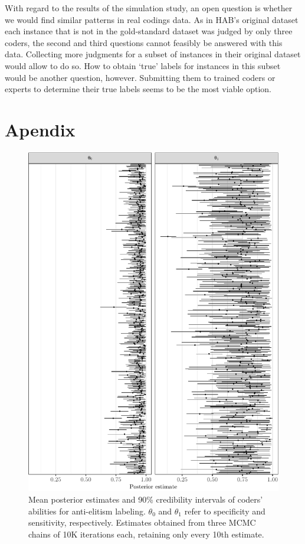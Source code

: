 \documentclass[12pt,]{article}
\begin{document}
With regard to the results of the simulation study, an open question is
whether we would find similar patterns in real codings data. As in HAB's
original dataset each instance that is not in the gold-standard dataset
was judged by only three coders, the second and third questions cannot
feasibly be answered with this data. Collecting more judgments for a
subset of instances in their original dataset would allow to do so. How
to obtain `true' labels for instances in this subset would be another
question, however. Submitting them to trained coders or experts to
determine their true labels seems to be the most viable option.

\hypertarget{apendix}{%
\section{Apendix}\label{apendix}}

\begin{figure}[H]

{\centering \includegraphics{licht_2019_evaluating_crowdsourced_elite_critique_codings_files/figure-latex/thetas_ae_intervals-1} 

}

\caption{Mean posterior estimates and 90\% credibility intervals of coders' abilities for anti-elitism labeling. $\theta_0$ and $\theta_1$ refer to specificity and sensitivity, respectively. Estimates obtained from three MCMC chains of 10K iterations each, retaining only every 10th estimate.}\label{fig:thetas_ae_intervals}
\end{figure}
\end{document}
